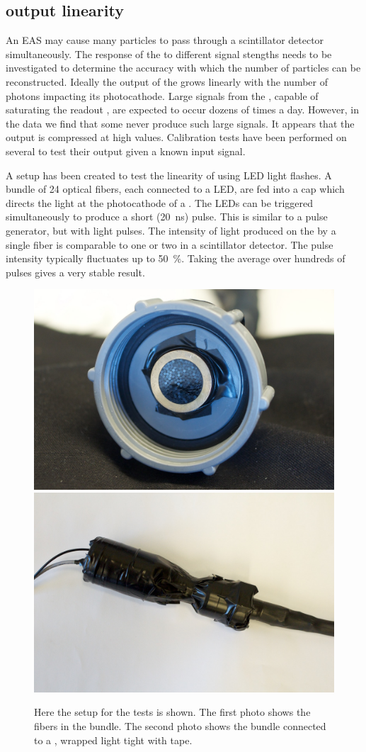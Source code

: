 \subsection{\pmt output linearity}
\label{sub:pmt_linearity}

An EAS may cause many particles to pass through a scintillator detector simultaneously. The response of the \pmt to different signal stengths needs to be investigated to determine the accuracy with which the number of particles can be reconstructed. Ideally the output of the \pmt grows linearly with the number of photons impacting its photocathode. Large signals from the \pmt, capable of saturating the readout \adcs, are expected to occur dozens of times a day. However, in the data we find that some \pmts never produce such large signals. It appears that the output is compressed at high values. Calibration tests have been performed on several \pmts to test their output given a known input signal.

A setup has been created to test the linearity of \pmts using LED light flashes. A bundle of 24 optical fibers, each connected to a LED, are fed into a cap which directs the light at the photocathode of a \pmt. The LEDs can be triggered simultaneously to produce a short (\SI{20}{\ns}) pulse. This is similar to a pulse generator, but with light pulses. The intensity of light produced on the \pmt by a single fiber is comparable to one or two \mip in a scintillator detector. The \pmt pulse intensity typically fluctuates up to \SI{50}{\percent}. Taking the average over hundreds of pulses gives a very stable result.

\begin{figure}
    \centering
    \includegraphics[width=0.45\linewidth]{plots/station/ARN_085351.jpg}
    \includegraphics[width=0.45\linewidth]{plots/station/ARN_085349.jpg}
    \caption{Here the setup for the \pmt tests is shown. The first photo shows the fibers in the bundle. The second photo shows the bundle connected to a \nikhef \pmt, wrapped light tight with tape.}
    \label{fig:pmt_test_setup}
\end{figure}

